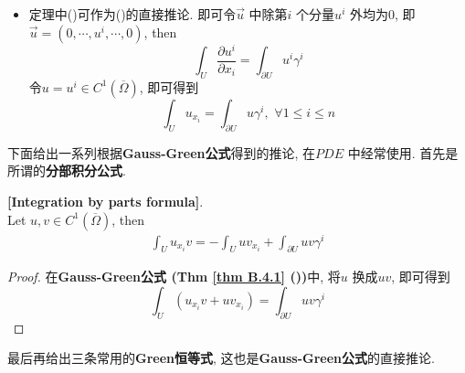 \begin{thm}
\begin{rmk}
\begin{itemize}
				\vspace{6em}
			
				\item 定理中()可作为()的直接推论. 即可令$\vec{u}$ 中除第$i$ 个分量$u^i$ 外均为0, 即$\vec{u} = (0 , \cdots , u^i , \cdots , 0)$, then
				\[ \int_{U} \frac{\partial u^i}{\partial x_i} = \int_{\partial U} u^i \gamma^i \]
				令$u = u^i \in C^{1}(\overline{\Omega})$, 即可得到
				\[ \int_{U} u_{x_i} = \int_{\partial U} u \gamma^i , \,\, \forall 1 \leq i \leq n \]
			\end{itemize}
		\end{rmk}
	\end{thm}

	\vspace{11em}

	下面给出一系列根据\textbf{Gauss-Green公式}得到的推论, 在$PDE$ 中经常使用. 首先是所谓的\textbf{分部积分公式}.

	\begin{corollary}\label{cor B.4.2}
		\textbf{[Integration by parts formula]}. \\
			Let $u , v \in C^{1}(\overline{\Omega})$, then
		\begin{align}
			\int_{U} u_{x_i} v = -\int_{U} u v_{x_i} + \int_{\partial U} u v \gamma^i
		\end{align}
	
		\vspace{6em}
	
		\begin{proof}
			在\textbf{Gauss-Green公式 (Thm \ref{thm B.4.1} ())}中, 将$u$ 换成$uv$, 即可得到
			\[ \int_{U} (u_{x_i}v + u v_{x_i}) = \int_{\partial U} u v \gamma^i \]
		\end{proof}
	\end{corollary}

	\newpage

	最后再给出三条常用的\textbf{Green恒等式}, 这也是\textbf{Gauss-Green公式}的直接推论.

